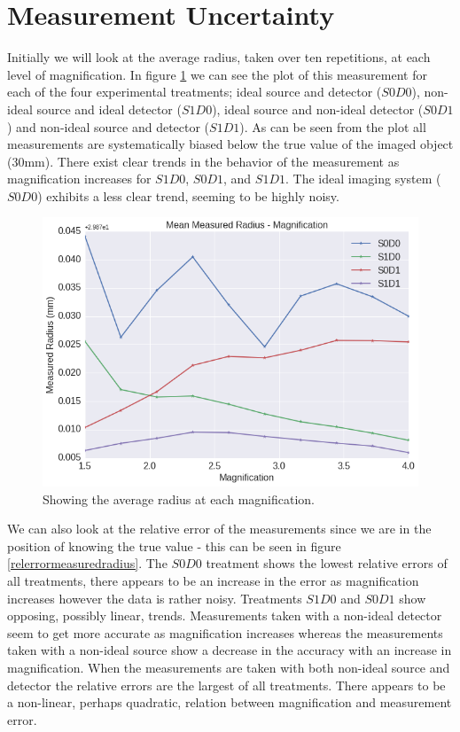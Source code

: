 \documentclass[
  twoside,
  11pt, a4paper,
  footinclude=true,
  headinclude=true,
  cleardoublepage=empty
]{scrbook}
\begin{document}
\section{Measurement Uncertainty}

Initially we will look at the average radius, taken over ten repetitions, at each level of magnification. In figure \ref{avgmeasuredradius} we can see the plot of this measurement for each of the four experimental treatments; ideal source and detector ($S0D0$), non-ideal source and ideal detector ($S1D0$), ideal source and non-ideal detector ($S0D1$) and non-ideal source and detector ($S1D1$). As can be seen from the plot all measurements are systematically biased below the true value of the imaged object (30mm). There exist clear trends in the behavior of the measurement as magnification increases for $S1D0$, $S0D1$, and $S1D1$. The ideal imaging system ($S0D0$) exhibits a less clear trend, seeming to be highly noisy.

\begin{figure}[h!]
  \centering
    \includegraphics[width=\textwidth]{figures/output_10_0.png}
    \caption{Showing the average radius at each magnification.}
    \label{avgmeasuredradius}
\end{figure}

We can also look at the relative error of the measurements since we are in the position of knowing the true value - this can be seen in figure \ref{relerrormeasuredradius}. The $S0D0$ treatment shows the lowest relative errors of all treatments, there appears to be an increase in the error as magnification increases however the data is rather noisy. Treatments $S1D0$ and $S0D1$ show opposing, possibly linear, trends. Measurements taken with a non-ideal detector seem to get more accurate as magnification increases whereas the measurements taken with a non-ideal source show a decrease in the accuracy with an increase in magnification. When the measurements are taken with both non-ideal source and detector the relative errors are the largest of all treatments. There appears to be a non-linear, perhaps quadratic, relation between magnification and measurement error.
\end{document}
